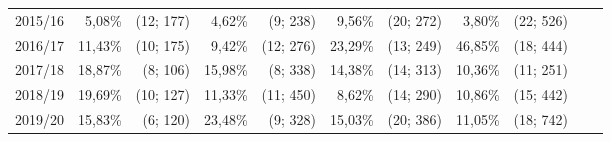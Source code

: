 \begin{table}[H]
\begin{tabular}{|c|*{5}{rr|}}
        2015/16 &  5,08\% & (12; 177) &  4,62\% &  (9; 238) &  9,56\% & (20; 272) &  3,80\% & (22; 526) &&\\
        2016/17 & 11,43\% & (10; 175) &  9,42\% & (12; 276) & 23,29\% & (13; 249) & 46,85\% & (18; 444) &&\\
        2017/18 & 18,87\% &  (8; 106) & 15,98\% &  (8; 338) & 14,38\% & (14; 313) & 10,36\% & (11; 251) &&\\
        2018/19 & 19,69\% & (10; 127) & 11,33\% & (11; 450) &  8,62\% & (14; 290) & 10,86\% & (15; 442) &&\\
        2019/20 & 15,83\% &  (6; 120) & 23,48\% &  (9; 328) & 15,03\% & (20; 386) & 11,05\% & (18; 742) &&\\
        \hline
    \end{tabular}
\end{table}